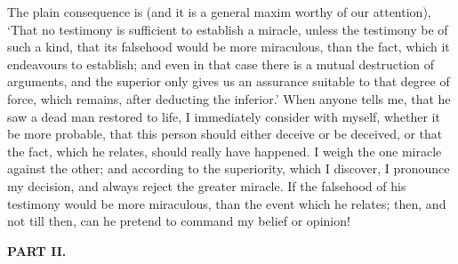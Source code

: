 \documentclass[]{article}
\newcommand*{\itemsubsection}[1]{\begin{center}\addcontentsline{toc}{subsection}{#1}\textbf{#1}\end{center}}
\begin{document}
\begin{sectionbody}
\humeparagraph  The plain consequence is (and it is a general maxim worthy of our attention), `That no testimony is sufficient to establish a miracle, unless the testimony be of such a kind, that its falsehood would be more miraculous, than the fact, which it endeavours to establish; and even in that case there is a mutual destruction of arguments, and the superior only gives us an assurance suitable to that degree of force, which remains, after deducting the inferior.' When anyone tells me, that he saw a dead man restored to life, I immediately consider with myself, whether it be more probable, that this person should either deceive or be deceived, or that the fact, which he relates, should really have happened. I weigh the one miracle against the other; and according to the superiority, which I discover, I pronounce my decision, and always reject the greater miracle. If the falsehood of his testimony would be more miraculous, than the event which he relates; then, and not till then, can he pretend to command my belief or opinion!

\end{sectionbody}

\itemsubsection{PART II.}
\end{document}

